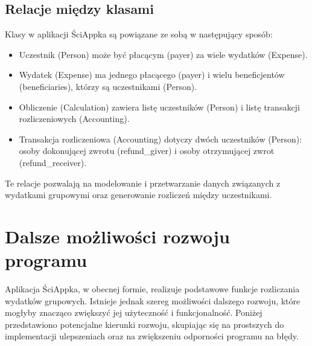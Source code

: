 \documentclass{article}
\begin{document}
\subsection{Relacje między klasami}

Klasy w aplikacji ŚciAppka są powiązane ze sobą w następujący sposób:
\begin{itemize}
\item Uczestnik (Person) może być płacącym (payer) za wiele wydatków (Expense).
\item Wydatek (Expense) ma jednego płacącego (payer) i wielu beneficjentów (beneficiaries), którzy są uczestnikami (Person).
\item Obliczenie (Calculation) zawiera listę uczestników (Person) i listę transakcji rozliczeniowych (Accounting).
\item Transakcja rozliczeniowa (Accounting) dotyczy dwóch uczestników (Person): osoby dokonującej zwrotu (refund\_giver) i osoby otrzymującej zwrot (refund\_receiver).
\end{itemize}
Te relacje pozwalają na modelowanie i przetwarzanie danych związanych z wydatkami grupowymi oraz generowanie rozliczeń między uczestnikami.

\section{Dalsze możliwości rozwoju programu}
Aplikacja ŚciAppka, w obecnej formie, realizuje podstawowe funkcje rozliczania wydatków grupowych. Istnieje jednak szereg możliwości dalszego rozwoju, które mogłyby znacząco zwiększyć jej użyteczność i funkcjonalność. Poniżej przedstawiono potencjalne kierunki rozwoju, skupiając się na prostszych do implementacji ulepszeniach oraz na zwiększeniu odporności programu na błędy.
\end{document}
